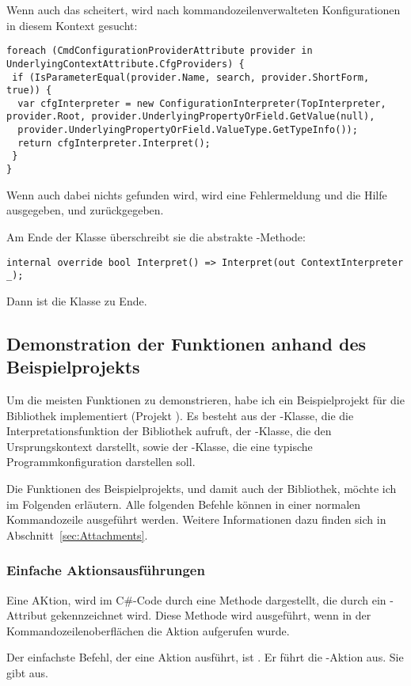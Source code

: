 Wenn auch das scheitert, wird nach kommandozeilenverwalteten Konfigurationen in diesem Kontext gesucht:
\begin{lstlisting}[title=""]
foreach (CmdConfigurationProviderAttribute provider in UnderlyingContextAttribute.CfgProviders) {
 if (IsParameterEqual(provider.Name, search, provider.ShortForm, true)) {
  var cfgInterpreter = new ConfigurationInterpreter(TopInterpreter, provider.Root, provider.UnderlyingPropertyOrField.GetValue(null),
  provider.UnderlyingPropertyOrField.ValueType.GetTypeInfo());
  return cfgInterpreter.Interpret();
 }
}
\end{lstlisting}
Wenn auch dabei nichts gefunden wird, wird eine Fehlermeldung und die Hilfe ausgegeben, und  zurückgegeben.

Am Ende der Klasse überschreibt sie die abstrakte -Methode:
\begin{lstlisting}[title=""]
 internal override bool Interpret() => Interpret(out ContextInterpreter _);
\end{lstlisting}
Dann ist die Klasse zu Ende.
\subsection{Demonstration der Funktionen anhand des Beispielprojekts}\label{subsec:demonstration}
Um die meisten Funktionen zu demonstrieren, habe ich ein Beispielprojekt für die Bibliothek implementiert (Projekt ).
Es besteht aus der -Klasse, die die Interpretationsfunktion der Bibliothek aufruft, der -Klasse, 
die den Ursprungskontext darstellt, sowie der -Klasse, die eine typische Programmkonfiguration darstellen soll.

Die Funktionen des Beispielprojekts, und damit auch der Bibliothek, möchte ich im Folgenden erläutern.
Alle folgenden Befehle können in einer normalen Kommandozeile ausgeführt werden.
Weitere Informationen dazu finden sich in Abschnitt~\ref{sec:Attachments}.%
\subsubsection{Einfache Aktionsausführungen}
Eine AKtion, wird im C\#-Code durch eine Methode dargestellt, die durch ein -Attribut gekennzeichnet wird.
Diese Methode wird ausgeführt, wenn in der Kommandozeilenoberflächen die Aktion aufgerufen wurde.

Der einfachste Befehl, der eine Aktion ausführt, ist .
Er führt die -Aktion aus.
Sie gibt  aus.

